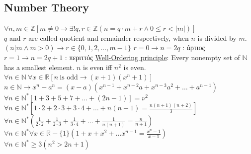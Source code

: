\documentclass[12pt]{article}
\begin{document}
\begin{flushleft}
	
	\pagebreak
	
	
		
	\section{Number Theory}
	
	\textbullet \quad $\forall n, m \in \mathbb{Z} \left[ m\neq 0 \rightarrow \exists !q, r \in \mathbb{Z}\left(n = q\cdot m + r \land 0 \leq r < |m| \right) \right] $ \\ $q$ and $r$ are called quotient and remainder respectively, when $n$ is divided by $m$. \linebreak 
	\textbullet \quad $(n|m \land m>0) \rightarrow r \in \{0,1,2,\ldots,m-1\} $ \linebreak 
	\textbullet \quad $ r = 0 \rightarrow n=2q $  :  \textgreek{άρτιος} \linebreak 
	\textbullet \quad $ r = 1\rightarrow n = 2q + 1 $  :  \textgreek{περιττός} \linebreak 
	\textbullet \quad \uline{Well-Ordering principle}: Every nonempty set of $\mathbb{N}$ has a smallest element. \linebreak 
	\textbullet \quad $n$ is even iff $n^2$ is even. \linebreak 
	\textbullet \quad $\displaystyle \forall n \in \mathbb{N} \ \forall x \in \mathbb{R} \left[ n \ \text{is odd} \rightarrow (x+1)(x^n+1) \right] $ \linebreak 
	\textbullet \quad $n \in \mathbb{N} \rightarrow x^n -a^n = (x-a)(x^{n-1} + x^{n-2}a + x^{n-3}a^2 + \ldots +a^{n-1} )$ \linebreak 
	\textbullet \quad $\forall n \in \mathbb{N}^* \left[1 + 3 + 5 + 7 + \ldots + (2n -1) \right] = \nu^2 $ \linebreak 
	\textbullet \quad $\displaystyle \forall n \in \mathbb{N}^* \left[ 1\cdot 2 + 2 \cdot 3 + 3\cdot 4 + \ldots + n(n+1) = \frac{n(n+1)(n+2)}{3} \right] $ \linebreak 
	\textbullet \quad $\displaystyle \forall n \in \mathbb{N}^* \left(\frac{1}{2\cdot 2} + \frac{1}{2\cdot 3} + \frac{1}{3 \cdot 4} + \ldots + \frac{1}{n(n+1)} = \frac{n}{n+1} \right)$ \linebreak 
	\textbullet \quad $\displaystyle \forall n \in \mathbb{N}^* \forall x \in \mathbb{R} - \{1\} \left(1+x+x^2+\ldots  x^{n-1} = \frac{x^n-1}{x-1} \right) $ \linebreak 
	\textbullet \quad $ \forall n \in \mathbb{N}^* \geq 3 \left( n^2 > 2n + 1 \right) $ \linebreak 

\end{flushleft}
\end{document}
